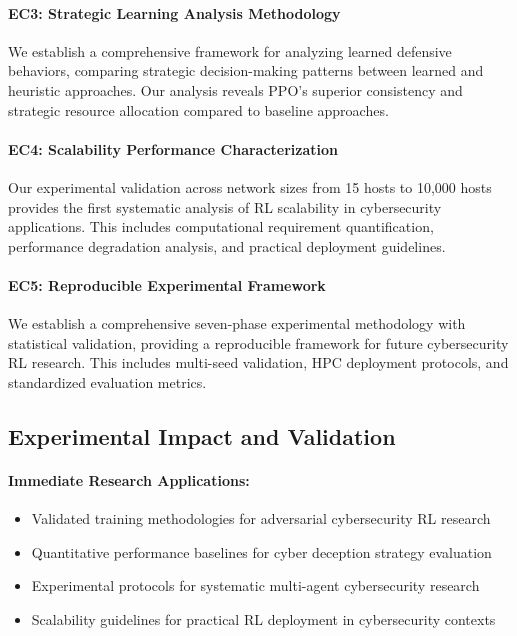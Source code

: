 \documentclass[12pt,oneside]{article}
\begin{document}
\paragraph{EC3: Strategic Learning Analysis Methodology}
We establish a comprehensive framework for analyzing learned defensive behaviors, comparing strategic decision-making patterns between learned and heuristic approaches. Our analysis reveals PPO's superior consistency and strategic resource allocation compared to baseline approaches.

\paragraph{EC4: Scalability Performance Characterization}
Our experimental validation across network sizes from 15 hosts to 10,000 hosts provides the first systematic analysis of RL scalability in cybersecurity applications. This includes computational requirement quantification, performance degradation analysis, and practical deployment guidelines.

\paragraph{EC5: Reproducible Experimental Framework}
We establish a comprehensive seven-phase experimental methodology with statistical validation, providing a reproducible framework for future cybersecurity RL research. This includes multi-seed validation, HPC deployment protocols, and standardized evaluation metrics.

\subsection{Experimental Impact and Validation}

\paragraph{Immediate Research Applications:}
\begin{itemize}
\item Validated training methodologies for adversarial cybersecurity RL research
\item Quantitative performance baselines for cyber deception strategy evaluation  
\item Experimental protocols for systematic multi-agent cybersecurity research
\item Scalability guidelines for practical RL deployment in cybersecurity contexts
\end{itemize}
\end{document}
